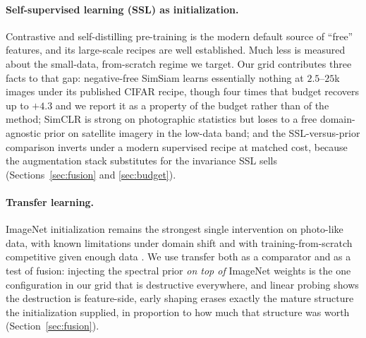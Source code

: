 \paragraph{Self-supervised learning (SSL) as initialization.}
Contrastive and self-distilling pre-training
\citep{chen2020simclr,chen2021simsiam,caron2021dino}
is the modern default source of ``free'' features, and its large-scale
recipes are well established. Much less is measured about the small-data,
from-scratch regime we target. Our
grid contributes three facts to that gap: negative-free SimSiam learns
essentially nothing at $2.5$--$25$k images under its published CIFAR
recipe, though four times that budget recovers up to $+4.3$ and we report
it as a property of the budget rather than of the method; SimCLR is strong
on photographic statistics but loses to a free domain-agnostic prior on
satellite imagery in the low-data band; and the SSL-versus-prior comparison
inverts under a modern supervised recipe at matched cost, because the
augmentation stack substitutes for the invariance SSL sells
(Sections~\ref{sec:fusion} and \ref{sec:budget}).

\paragraph{Transfer learning.}
ImageNet initialization remains the strongest single intervention on
photo-like data, with known limitations under
domain shift and with training-from-scratch competitive given enough data
\citep{he2019rethinking}. We use transfer both as a comparator and as a
test of fusion: injecting the spectral prior \emph{on top of} ImageNet
weights is the one configuration in our grid that is destructive
everywhere, and linear probing shows the destruction is feature-side,
early shaping erases exactly the mature structure the initialization
supplied, in proportion to how much that structure was worth
(Section~\ref{sec:fusion}).

